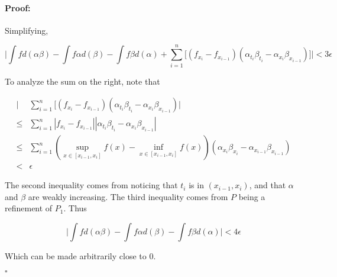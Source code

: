\documentclass{article}
\newenvironment{proof}{\paragraph{Proof:}}{\hfill$\square$}
\begin{document}
\begin{proof}
Simplifying,

\[
\bigg|
\int f d(\alpha\beta) - \int f\alpha d(\beta) - \int f\beta d(\alpha) +
\sum_{i=1}^n \Big[
(f_{x_i} - f_{x_{i-1}}) (\alpha_{t_i}\beta_{t_i} - \alpha_{x_i}\beta_{x_{i-1}})
\Big] \bigg|
< 3\epsilon
\]

To analyze the sum on the right, note that

\begin{align*}
\bigg|
&\sum_{i=1}^n \Big[(f_{x_i} - f_{x_{i-1}}) (\alpha_{t_i}\beta_{t_i} - \alpha_{x_i}\beta_{x_{i-1}})
\bigg| \\
\leq &\sum_{i=1}^n \left|f_{x_i} - f_{x_{i-1}}\right| \left|\alpha_{t_i}\beta_{t_i} - \alpha_{x_i}\beta_{x_{i-1}}\right| \\
\leq &\sum_{i=1}^n \left(\sup_{x \in [x_{i-1}, x_i]} f(x) - \inf_{x \in [x_{i-1}, x_i]} f(x)\right)
\left(\alpha_{x_i}\beta_{x_i} - \alpha_{x_{i-1}}\beta_{x_{i-1}}\right) \\
< &\epsilon
\end{align*}

The second inequality comes from noticing that $t_i$ is in $(x_{i-1}, x_i)$, and that $\alpha$ and $\beta$ are weakly increasing. The third inequality comes from $P$ being a refinement of $P_1$. Thus

\[
\bigg| \int f d(\alpha\beta) - \int f\alpha d(\beta) - \int f\beta d(\alpha) \bigg|
< 4\epsilon
\]

Which can be made arbitrarily close to 0.

\end{proof}
\end{document}
